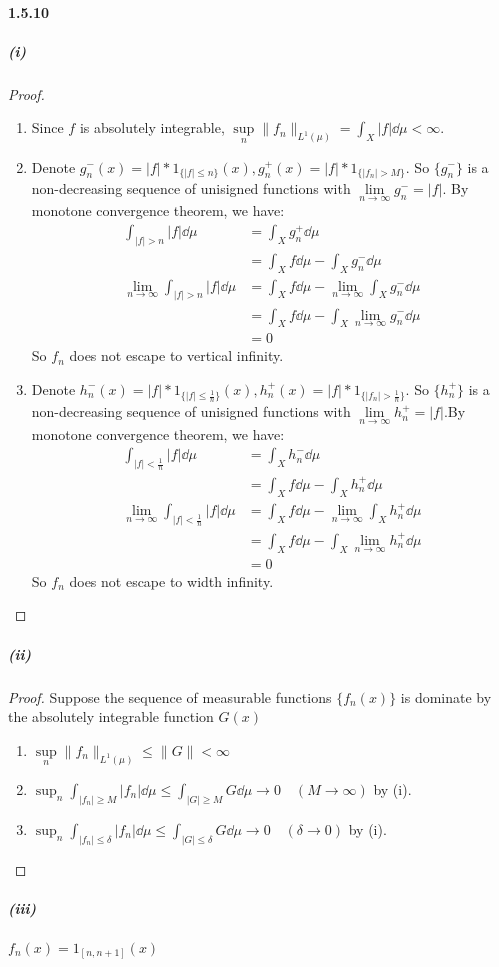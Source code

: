 \documentclass{article}
\begin{document}
\paragraph{1.5.10}
\subparagraph{(i)}
\begin{proof}
\begin{enumerate}
\item Since $f$ is absolutely integrable, $\sup\limits_{n}\|f_n\|_{L^1(\mu)}=\int_{X}|f|\dd\mu<\infty$.
\item Denote $g^-_n(x)=|f|*1_{\{|f|\leq n\}}(x), g^+_n(x)=|f|*1_{\{|f_n|>M\}}$. So $\{g^-_n\}$ is a non-decreasing sequence of unisigned functions with $\lim\limits_{n\to\infty}g^-_n=|f|$. By monotone convergence theorem, we have:
\[\begin{aligned}
\int_{|f|>n}|f|\dd\mu &=\int_{X}g^+_n\dd\mu\\
&=\int_{X}f\dd\mu-\int_{X}g^-_n\dd\mu\\
\lim_{n\to\infty}\int_{|f|>n}|f|\dd\mu&=\int_{X}f\dd\mu-\lim_{n\to\infty}\int_{X}g^-_n\dd\mu\\
&=\int_{X}f\dd\mu-\int_{X}\lim_{n\to\infty}g^-_n\dd\mu\\
&=0
\end{aligned}\]
So $f_n$ does not escape to vertical infinity.
\item Denote $h^-_n(x)=|f|*1_{\{|f|\leq \frac 1 n\}}(x), h^+_n(x)=|f|*1_{\{|f_n|>\frac 1 n\}}$.  So $\{h^+_n\}$ is a non-decreasing sequence of unisigned functions with $\lim\limits_{n\to\infty}h^+_n=|f|$.By monotone convergence theorem, we have:
\[\begin{aligned}
\int_{|f|<\frac 1 n}|f|\dd\mu &=\int_{X}h^-_n\dd\mu\\
&=\int_{X}f\dd\mu-\int_{X}h^+_n\dd\mu\\
\lim_{n\to\infty}\int_{|f|<\frac 1 n}|f|\dd\mu &=\int_{X}f\dd\mu-\lim_{n\to\infty}\int_{X}h^+_n\dd\mu\\
&=\int_{X}f\dd\mu-\int_{X}\lim_{n\to\infty}h^+_n\dd\mu\\
&=0
\end{aligned}\]
So $f_n$ does not escape to width infinity.
\end{enumerate}
\end{proof}
\subparagraph{(ii)}
\begin{proof}
Suppose the sequence of measurable functions $\{f_n(x)\}$ is dominate by the absolutely integrable function $G(x)$
\begin{enumerate}
\item $\sup\limits_{n}\|f_n\|_{L^1(\mu)}\leq \|G\|<\infty$
\item $\sup_{n}\int_{|f_n|\geq M}|f_n|\dd\mu\leq \int_{|G|\geq M}G\dd\mu\to 0\quad (M\to \infty)$ by (i).
\item $\sup_{n}\int_{|f_n|\leq \delta}|f_n|\dd\mu\leq \int_{|G|\leq \delta}G\dd\mu\to 0\quad (\delta\to 0)$ by (i).
\end{enumerate}
\end{proof}
\subparagraph{(iii)}
$f_n(x)=1_{[n,n+1]}(x)$
\end{document}
